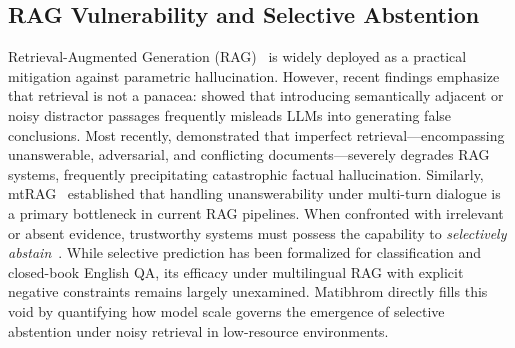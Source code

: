 \subsection{RAG Vulnerability and Selective Abstention}
Retrieval-Augmented Generation (RAG)~\citep{lewis2020rag} is widely deployed as a practical mitigation against parametric hallucination. However, recent findings emphasize that retrieval is not a panacea: \citet{cuconasu2024power} showed that introducing semantically adjacent or noisy distractor passages frequently misleads LLMs into generating false conclusions. Most recently, \citet{park2024robust} demonstrated that imperfect retrieval---encompassing unanswerable, adversarial, and conflicting documents---severely degrades RAG systems, frequently precipitating catastrophic factual hallucination. Similarly, mtRAG~\citep{katsis2025mtrag} established that handling unanswerability under multi-turn dialogue is a primary bottleneck in current RAG pipelines. When confronted with irrelevant or absent evidence, trustworthy systems must possess the capability to \emph{selectively abstain}~\citep{kadavath2022language,cole2023selectively,yin2023large}. While selective prediction has been formalized for classification and closed-book English QA, its efficacy under multilingual RAG with explicit negative constraints remains largely unexamined. Matibhrom directly fills this void by quantifying how model scale governs the emergence of selective abstention under noisy retrieval in low-resource environments.
